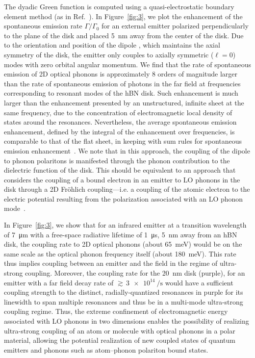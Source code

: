 \documentclass[aps,prb,twocolumn,
	           groupedaddress,superscriptaddress,
               amsfonts,amssymb,amsmath,floatfix,
	           citeautoscript]{revtex4-1}
\makeatletter
\newcommand{\ie}{i.e.\@\xspace} %
\makeatother
\begin{document}
The dyadic Green function is computed using a quasi-electrostatic boundary element method (as in Ref.~). In Figure~\ref{fig:3}, we plot the enhancement of the spontaneous emission rate $\Gamma/\Gamma_0$ for an external emitter polarized perpendicularly to the plane of the disk and placed \SI{5}{\nm} away from the center of the disk. Due to the orientation and position of the dipole , which maintains the axial symmetry of the disk, the emitter only couples to axially symmetric ($\ell = 0$)  modes with zero orbital angular momentum. We find that the rate of spontaneous emission of 2D optical phonons is approximately 8 orders of magnitude larger than the rate of spontaneous emission of photons in the far field at frequencies corresponding to resonant modes of the hBN disk. Such enhancement is much larger than the enhancement presented by an unstructured, infinite sheet at the same frequency, due to the concentration of electromagnetic local density of states around the resonances. Nevertheless, the average spontaneous emission enhancement, defined by the integral of the enhancement over frequencies, is comparable to that of the flat sheet, in keeping with sum rules for spontaneous emission enhancement~\cite{scheel2008macroscopic}.  We note that in this approach, the coupling of the dipole to phonon polaritons is manifested through the phonon contribution to the dielectric function of the disk. This should be equivalent to an approach that considers the coupling of a bound electron in an emitter to LO phonons in the disk through a 2D Fr\"ohlich coupling---\ie a coupling of the atomic electron to the electric potential resulting from the polarization associated with an LO phonon mode~\cite{sohier2016two}.

In Figure~\ref{fig:3}, we show that for an infrared emitter at a transition wavelength of \SI{7}{\micro\m} with a free-space radiative lifetime of \SI{1}{\micro\s}, \SI{5}{\nm} away from an hBN disk, the coupling rate to 2D optical phonons (about \SI{65}{\meV}) would be on the same scale as the optical phonon frequency itself (about \SI{180}{\meV}). This rate thus implies coupling between an emitter and the field in the regime of ultra-strong coupling. Moreover, the coupling rate for the \SI{20}{\nm} disk (purple), for an emitter with a far field decay rate of ${\gtrsim}\,\SI{3e14}{\per\s}$ would have a sufficient coupling strength to the distinct, radially-quantized resonances in purple for its linewidth to span multiple resonances and thus be in a multi-mode ultra-strong coupling regime. Thus, the extreme confinement of electromagnetic energy associated with LO phonons in two dimensions enables the possibility of realizing ultra-strong coupling of an atom or molecule with optical phonons in a polar material, allowing the potential realization of new coupled states of quantum emitters and phonons such as atom--phonon polariton bound states.
\end{document}
